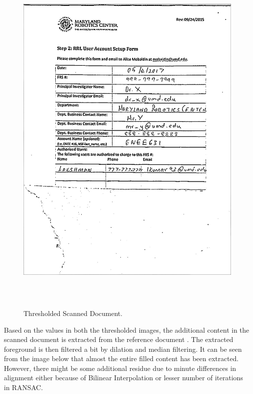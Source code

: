 \begin{figure}[th]
	\centering
	\includegraphics[height=18cm ]{Figures/thresholded_scanned_image}
	\caption[Thresholded Scanned Document]{Thresholded Scanned Document.}
	\label{fig:ThresholdedScannedDocument}
\end{figure}

\pagebreak

Based on the values in both the thresholded images, the additional content in the scanned document is extracted from the reference document . The extracted foreground is then filtered a bit by dilation and median filtering. It can be seen from the image below that almost the entire filled content has been extracted. However, there might be some additional residue due to minute differences in alignment either because of Bilinear Interpolation or lesser number of iterations in RANSAC. \\ \\

